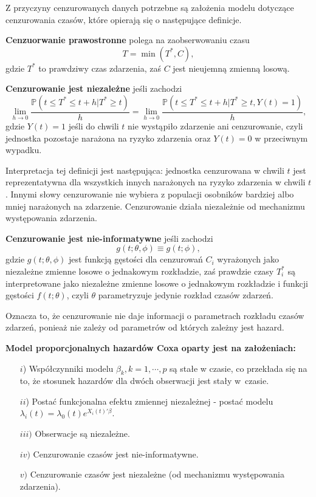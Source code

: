 Z przyczyny cenzurowanych danych potrzebne są założenia modelu dotyczące cenzurowania czasów, które opierają się o następujące definicje.

\begin{definition}
\textbf{Cenzuorwanie prawostronne} polega na zaobserwowaniu czasu 
$$T= \min(T^*, C),$$
gdzie $T^*$ to prawdziwy czas zdarzenia, zaś $C$ jest nieujemną zmienną losową.
\end{definition}


\begin{definition}
\textbf{Cenzurowanie jest niezależne} jeśli zachodzi
$$ \lim\limits_{h\rightarrow 0}\dfrac{\mathbb{P}(t \leq T^* \leq t +h | T^* \geq t)}{h} =  \lim\limits_{h\rightarrow 0}\dfrac{\mathbb{P}(t \leq T^* \leq t +h | T^* \geq t, Y(t) = 1)}{h},$$
gdzie $Y(t) = 1$ jeśli do chwili $t$ nie wystąpiło zdarzenie ani cenzurowanie, czyli jednostka pozostaje narażona na ryzyko zdarzenia oraz $Y(t)=0$ w przeciwnym wypadku.
\end{definition}

Interpretacja tej definicji jest następująca: jednostka cenzurowana w chwili $t$ jest reprezentatywna dla wszystkich innych narażonych na ryzyko zdarzenia w chwili $t$. Innymi słowy cenzurowanie nie wybiera z populacji osobników bardziej albo mniej narażonych na zdarzenie. Cenzurowanie działa niezależnie od mechanizmu występowania zdarzenia.

\begin{definition}
\textbf{Cenzurowanie jest nie-informatywne} jeśli zachodzi
\begin{equation}\label{nieinf}
g(t;\theta, \phi) \equiv g(t;\phi),
\end{equation}
gdzie $g(t;\theta, \phi)$ jest funkcją gęstości dla cenzurowań $C_i$ wyrażonych jako niezależne zmienne losowe o jednakowym rozkładzie, zaś prawdzie czasy $T^*_i$ są interpretowane jako niezależne zmienne losowe o jednakowym rozkładzie i funkcji gęstości $f(t;\theta)$, czyli $\theta$ parametryzuje jedynie rozkład czasów zdarzeń.
\end{definition}

Oznacza to, że cenzurowanie nie daje informacji o parametrach rozkładu czasów zdarzeń, ponieaż nie zależy od parametrów od których zależny jest hazard.

\textbf{Model proporcjonalnych hazardów Coxa oparty jest na założeniach:}
\begin{enumerate}
\item[$i$)] Współczynniki modelu $\beta_k, k = 1,\cdots,p$ są stałe w czasie, co przekłada się na to, że stosunek hazardów dla dwóch obserwacji jest stały w~czasie.
\item[$ii$)] Postać funkcjonalna efektu zmiennej niezależnej - postać modelu $\lambda_i(t) = \lambda_0(t)e^{X_i(t)'\beta}$.
\item[$iii)$] Obserwacje są niezależne.
\item[$iv)$] Cenzurowanie czasów jest nie-informatywne.
\item[$v)$] Cenzurowanie czasów jest niezależne (od mechanizmu występowania zdarzenia).
\end{enumerate}

